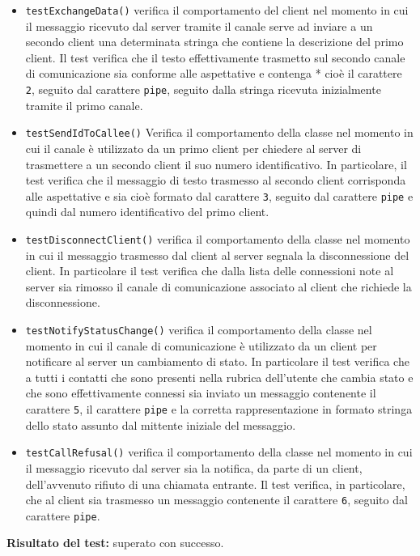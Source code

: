 \begin{itemize}
\begin{itemize}
\item \texttt{testExchangeData()} verifica il comportamento del client nel momento in cui il messaggio ricevuto dal server tramite il canale serve ad inviare a un secondo client una determinata stringa che contiene la descrizione del primo client. Il test verifica che il testo effettivamente trasmetto sul secondo canale di comunicazione sia conforme alle aspettative e contenga * cioè il carattere \texttt{2}, seguito dal carattere \texttt{pipe}, seguito dalla stringa ricevuta inizialmente tramite il primo canale.

\item \texttt{testSendIdToCallee()} Verifica il comportamento della classe nel momento in cui il canale è utilizzato da un primo client per chiedere al server di trasmettere a un secondo client il suo numero identificativo. In particolare, il test verifica che il messaggio di testo trasmesso al secondo client corrisponda alle aspettative e sia cioè formato dal carattere \texttt{3}, seguito dal carattere \texttt{pipe} e quindi dal numero identificativo del primo client.

\item \texttt{testDisconnectClient()} verifica il comportamento della classe nel momento in cui il messaggio trasmesso dal client al server segnala la disconnessione del client. In particolare il test verifica che dalla lista delle connessioni note al server sia rimosso il canale di comunicazione associato al client che richiede la disconnessione.

\item \texttt{testNotifyStatusChange()} verifica il comportamento della classe nel momento in cui il canale di comunicazione è utilizzato da un client per notificare al server un cambiamento di stato. In particolare il test verifica che a tutti i contatti che sono presenti nella rubrica dell'utente che cambia stato e che sono effettivamente connessi sia inviato un messaggio contenente il carattere \texttt{5}, il carattere \texttt{pipe} e la corretta rappresentazione in formato stringa dello stato assunto dal mittente iniziale del messaggio.

\item \texttt{testCallRefusal()} verifica il comportamento della classe nel momento in cui il messaggio  ricevuto dal server sia la notifica, da parte di un client, dell'avvenuto rifiuto di una chiamata entrante. Il test verifica, in particolare, che al client sia trasmesso un messaggio contenente il carattere \texttt{6}, seguito dal carattere \texttt{pipe}.

\end{itemize}
\textbf{Risultato del test:} superato con successo.
\end{itemize}


